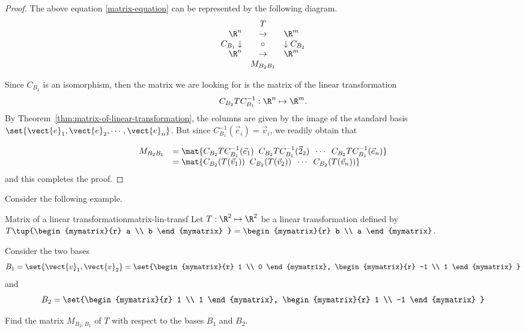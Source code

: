 \begin{proof}
The above equation {\eqref{matrix-equation}} can be represented by the following diagram.
\begin{equation*}
\begin{array}{rrcll}
&  & T &  &  \\
& \R^n & \rightarrow  & \R^m & \\
& C_{B_{1} }\downarrow  & \circ  & \downarrow C_{B_{2} } &  \\
& \R^{n} & \rightarrow  & \R^{m} &  \\
&  & M_{B_{2} B_{1} } &  &
\end{array}
\end{equation*}

Since $C_{B_1}$ is an isomorphism, then the matrix we are looking for is the matrix of the linear transformation 
\[   C_{B_2} T C^{-1}_{B_1} : \R^n \mapsto \R^m. \]
By Theorem~\ref{thm:matrix-of-linear-transformation}, the columns are
given by the image of the standard basis $\set{\vect{e}_1,
\vect{e}_2, \cdots, \vect{e}_n }$. But since $C^{-1}_{B_1}( \vec{e}_i) = \vec{v}_i$, we readily obtain that 

\[ \begin{array}{ll} 
M_{B_{2} B_{1}} 
& = \mat{C_{B_2}T C^{-1}_{B_1} (\vec{e}_1) \;\; C_{B_2}T C^{-1}_{B_1} (\vec{2}_2) \;\; \cdots \;\; C_{B_2}T C^{-1}_{B_1} (\vec{e}_n) } \\
& = \mat{C_{B_2}(T(\vec{v}_1)) \;\; C_{B_2}(T(\vec{v}_2)) \;\; \cdots \;\; C_{B_2}(T(\vec{v}_n)) } 
\end{array}\]
and this completes the proof. 
\end{proof}

Consider the following example.

\begin{example}{Matrix of a linear transformation}{matrix-lin-transf}
Let $T: \R^2 \mapsto \R^2$ be a linear transformation defined by $T \tup{\begin{mymatrix}{r}
a \\
b
\end{mymatrix} } = \begin{mymatrix}{r}
b \\
a 
\end{mymatrix}$. 

Consider the two bases
\[
B_1 = \set{\vect{v}_{1}, \vect{v}_{2} } = \set{\begin{mymatrix}{r}
1 \\
0
\end{mymatrix}, \begin{mymatrix}{r}
-1 \\
1
\end{mymatrix}
}
\]
 and 
\[
B_2 = \set{\begin{mymatrix}{r}
1 \\
1
\end{mymatrix}, \begin{mymatrix}{r}
1 \\
-1
\end{mymatrix}
}
\]

Find the matrix $M_{B_2,B_1}$ of $T$ with respect to the bases $B_1$ and $B_2$. 
\end{example}

